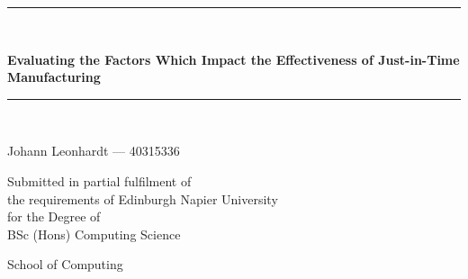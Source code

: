 \newcommand{\HRule}{\rule{\linewidth}{0.5mm}}

\begin{titlepage}
\begin{center}
\HRule{} \\[0.4cm]
    {\large \bfseries Evaluating the Factors Which Impact the Effectiveness of Just-in-Time Manufacturing\par}
\vspace{0.2cm}
\HRule{} \\[1.5cm]

\vspace{3cm}
\begin{minipage}{0.5\textwidth}
    \begin{center} \large
        Johann Leonhardt --- 40315336      
    \end{center}
\end{minipage}

\vspace{2cm}
\begin{minipage}{1\textwidth}
    \begin{center} \large
    Submitted in partial fulfilment of \\
    the requirements of Edinburgh Napier University \\
    for the Degree of \\
    BSc (Hons) Computing Science
    \end{center}
\end{minipage}

\vfill

\begin{minipage}{1\textwidth}
    \begin{center} \large
    School of Computing
    \end{center}
\end{minipage}

\vspace{1cm}{\large \today}
\end{center}
\end{titlepage}
